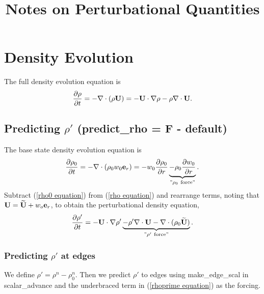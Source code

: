 \documentclass[11pt]{article}
\title{Notes on Perturbational Quantities}
\def\eb    {{\bf e}}
\def\Ub    {{\bf U}}
\def\Ubt   {\widetilde{\bf U}}
\begin{document}
\maketitle
\tableofcontents
\cleardoublepage

\section{Density Evolution}
The full density evolution equation is
\begin{equation}
\frac{\partial\rho}{\partial t} = -\nabla\cdot(\rho\Ub) = -\Ub\cdot\nabla\rho 
- \rho\nabla\cdot\Ub. \label{rho equation}
\end{equation}
\subsection{Predicting $\rho'$ (predict\_rho = F - default)}
The base state density evolution equation is
\begin{equation}
\frac{\partial\rho_0}{\partial t} = -\nabla\cdot(\rho_0 w_0 \eb_r) = 
-w_0\frac{\partial\rho_0}{\partial r} 
\underbrace{-\rho_0\frac{\partial w_0}{\partial r}}_{"\rho_0 ~ \text{force}"}.
\label{rho0 equation}
\end{equation}
Subtract (\ref{rho0 equation}) from (\ref{rho equation}) and rearrange terms, noting that 
$\Ub = \Ubt + w_o\eb_r$, to obtain the perturbational density equation,
\begin{equation}
\frac{\partial\rho'}{\partial t} = -\Ub\cdot\nabla\rho' \underbrace{- \rho'\nabla\cdot\Ub 
- \nabla\cdot(\rho_0\Ubt)}_{"\rho' ~ \text{force}"}. 
\label{rhoprime equation}
\end{equation}
\subsubsection{Predicting $\rho'$ at edges}
We define $\rho' = \rho^n - \rho_0^n$.  Then we predict $\rho'$ to edges using 
make\_edge\_scal in scalar\_advance and the underbraced term in (\ref{rhoprime equation}) 
as the forcing.
\end{document}
